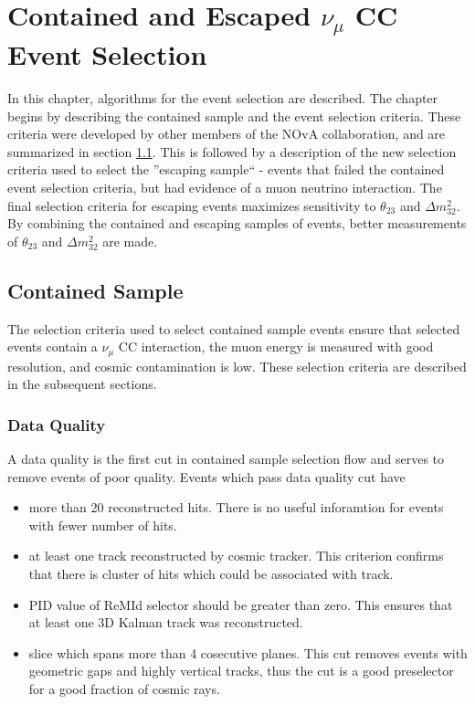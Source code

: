 \chapter{Contained and Escaped $\nu_\mu$ CC Event Selection}
\label{event_selection_chapter}

In this chapter, algorithms for the event selection are
described. The chapter begins by describing the contained sample and the event selection
criteria. These criteria were developed by other members of the NOvA collaboration,
and are summarized in section \ref{cont_sec}.  This is followed by a description of
the new selection criteria used to select the ''escaping sample`` - events that failed
the contained event selection criteria, but had evidence of a muon neutrino interaction. The
final selection criteria for escaping events maximizes sensitivity to
$\theta_{23}$ and $\Delta m_{32}^2$. By combining the contained and escaping samples of 
events, better measurements of $\theta_{23}$ and $\Delta m_{32}^2$ are made.

\section{Contained Sample} \label{cont_sec}
The selection criteria used to select contained sample events ensure that selected events
contain a $\nu_\mu$ CC interaction, the muon energy is measured with good resolution,
and cosmic contamination is low.  These selection criteria are described in the subsequent
sections.

\subsection{Data Quality}
A data quality is the first cut in contained sample selection flow and serves to remove 
events of poor quality. Events which pass data quality cut have
\begin{itemize}
\item more than 20 reconstructed hits. There is no useful inforamtion for events with fewer 
number of hits.
\item at least one track reconstructed by cosmic tracker. This criterion confirms that there is
cluster of hits which could be associated with track.
\item PID value of ReMId selector should be greater than zero. This ensures that at least one 
3D Kalman track was reconstructed.
\item slice which spans more than 4 cosecutive planes. This cut removes events with geometric 
gaps and highly vertical tracks, thus the cut is a good preselector for a good fraction of 
cosmic rays.
\end{itemize}

